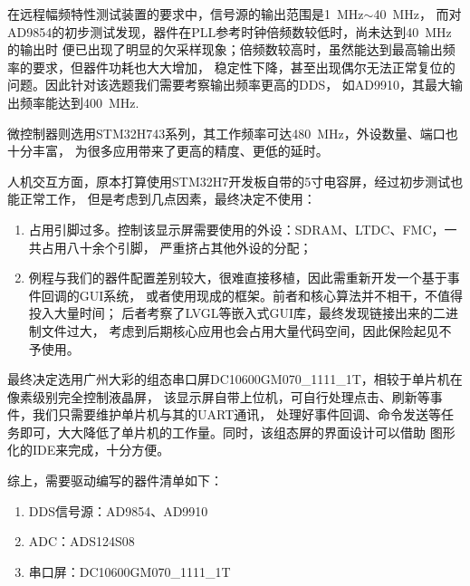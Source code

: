在远程幅频特性测试装置的要求中，信号源的输出范围是\SI{1}{MHz}$\sim$\SI{40}{MHz}，
而对AD9854的初步测试发现，器件在PLL参考时钟倍频数较低时，尚未达到\SI{40}{MHz}的输出时
便已出现了明显的欠采样现象；倍频数较高时，虽然能达到最高输出频率的要求，但器件功耗也大大增加，
稳定性下降，甚至出现偶尔无法正常复位的问题。因此针对该选题我们需要考察输出频率更高的DDS，
如AD9910，其最大输出频率能达到\SI{400}{MHz}.

微控制器则选用STM32H743系列，其工作频率可达\SI{480}{MHz}，外设数量、端口也十分丰富，
为很多应用带来了更高的精度、更低的延时。

人机交互方面，原本打算使用STM32H7开发板自带的5寸电容屏，经过初步测试也能正常工作，
但是考虑到几点因素，最终决定不使用：

\begin{enumerate}
    \item 占用引脚过多。控制该显示屏需要使用的外设：SDRAM、LTDC、FMC，一共占用八十余个引脚，
    严重挤占其他外设的分配；
    \item 例程与我们的器件配置差别较大，很难直接移植，因此需重新开发一个基于事件回调的GUI系统，
    或者使用现成的框架。前者和核心算法并不相干，不值得投入大量时间；
    后者考察了LVGL等嵌入式GUI库，最终发现链接出来的二进制文件过大，
    考虑到后期核心应用也会占用大量代码空间，因此保险起见不予使用。
\end{enumerate}

最终决定选用广州大彩的组态串口屏DC10600GM070\_1111\_1T，相较于单片机在像素级别完全控制液晶屏，
该显示屏自带上位机，可自行处理点击、刷新等事件，我们只需要维护单片机与其的UART通讯，
处理好事件回调、命令发送等任务即可，大大降低了单片机的工作量。同时，该组态屏的界面设计可以借助
图形化的IDE来完成，十分方便。

综上，需要驱动编写的器件清单如下：

\begin{enumerate}
    \item DDS信号源：AD9854、AD9910
    \item ADC：ADS124S08
    \item 串口屏：DC10600GM070\_1111\_1T
\end{enumerate}
